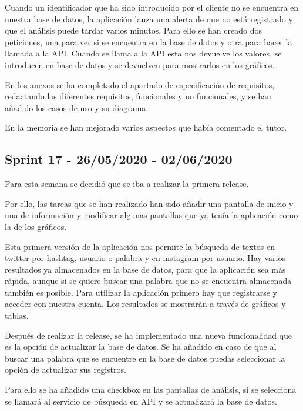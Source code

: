 Cuando un identificador que ha sido introducido por el cliente no se encuentra en nuestra base de datos, la aplicación lanza una alerta de que no está registrado y que el análisis puede tardar varios minutos. Para ello se han creado dos peticiones, una para ver si se encuentra en la base de datos y otra para hacer la llamada a la API. Cuando se llama a la API esta nos devuelve los valores, se introducen en base de datos y se devuelven para mostrarlos en los gráficos.

En los anexos se ha completado el apartado de especificación de requisitos, redactando los diferentes requisitos, funcionales y no funcionales, y se han añadido los casos de uso y su diagrama. 

En la memoria se han mejorado varios aspectos que había comentado el tutor.

\newpage
\subsection{Sprint 17 - 26/05/2020 - 02/06/2020}
Para esta semana se decidió que se iba a realizar la primera release.

Por ello, las tareas que se han realizado han sido añadir una pantalla de inicio y una de información y modificar algunas pantallas que ya tenía la aplicación como la de los gráficos.

Esta primera versión de la aplicación nos permite la búsqueda de textos en twitter por hashtag, usuario o palabra y en instagram por usuario. Hay varios resultados ya almacenados en la base de datos, para que la aplicación sea más rápida, aunque si se quiere buscar una palabra que no se encuentra almacenada también es posible.
Para utilizar la aplicación primero hay que registrarse y acceder con nuestra cuenta. Los resultados se mostrarán a través de gráficos y tablas.

Después de realizar la release, se ha implementado una nueva funcionalidad que es la opción de actualizar la base de datos. Se ha añadido en caso de que al buscar una palabra que se encuentre en la base de datos puedas seleccionar la opción de actualizar sus registros.

Para ello se ha añadido una checkbox en las pantallas de análisis, si se selecciona se llamará al servicio de búsqueda en API y se actualizará la base de datos.


